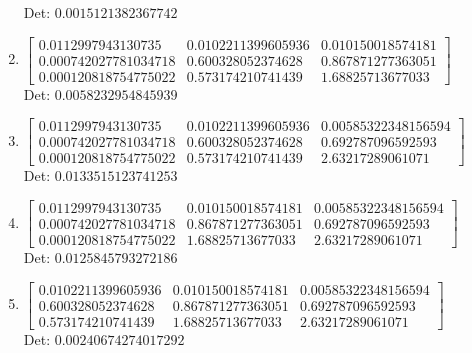 \documentclass[12pt]{article}
\begin{document}
\begin{enumerate}
Det: $0.0015121382367742$\\

\item $\displaystyle \left[\begin{matrix}0.0112997943130735 & 0.0102211399605936 & 0.010150018574181\\0.000742027781034718 & 0.600328052374628 & 0.867871277363051\\0.000120818754775022 & 0.573174210741439 & 1.68825713677033\end{matrix}\right]$\\

Det: $0.0058232954845939$\\

\item $\displaystyle \left[\begin{matrix}0.0112997943130735 & 0.0102211399605936 & 0.00585322348156594\\0.000742027781034718 & 0.600328052374628 & 0.692787096592593\\0.000120818754775022 & 0.573174210741439 & 2.63217289061071\end{matrix}\right]$\\

Det: $0.0133515123741253$\\

\item $\displaystyle \left[\begin{matrix}0.0112997943130735 & 0.010150018574181 & 0.00585322348156594\\0.000742027781034718 & 0.867871277363051 & 0.692787096592593\\0.000120818754775022 & 1.68825713677033 & 2.63217289061071\end{matrix}\right]$\\

Det: $0.0125845793272186$\\

\item $\displaystyle \left[\begin{matrix}0.0102211399605936 & 0.010150018574181 & 0.00585322348156594\\0.600328052374628 & 0.867871277363051 & 0.692787096592593\\0.573174210741439 & 1.68825713677033 & 2.63217289061071\end{matrix}\right]$\\

Det: $0.00240674274017292$\\


\end{enumerate}
\end{document}

